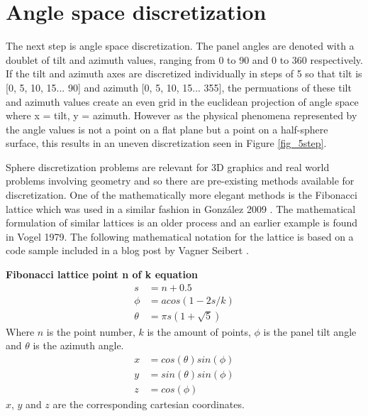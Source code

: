 \section{Angle space discretization}\label{angle_space_discretization}
The next step is angle space discretization. The panel angles are denoted with a doublet of tilt and azimuth values, ranging from 0 to 90 and 0 to 360 respectively. If the tilt and azimuth axes are discretized individually in steps of 5 so that tilt is [0, 5, 10, 15... 90] and azimuth [0, 5, 10, 15... 355], the permuations of these tilt and azimuth values create an even grid in the euclidean projection of angle space where x = tilt, y = azimuth. However as the physical phenomena represented by the angle values is not a point on a flat plane but a point on a half-sphere surface, this results in an uneven discretization seen in Figure \ref{fig_5step}. 

Sphere discretization problems are relevant for 3D graphics and real world problems involving geometry and so there are pre-existing methods available for discretization. One of the mathematically more elegant methods is the Fibonacci lattice which was used in a similar fashion in González 2009 \cite{Gonzlez}. The mathematical formulation of similar lattices is an older process and an earlier example is found in Vogel 1979\cite{fibolat_old}. The following mathematical notation for the lattice is based on a code sample included in a blog post by Vagner Seibert \cite{medium_fibolat_equation}.




\noindent \textbf{Fibonacci lattice point n of k equation}
\begin{align}
	s &= n + 0.5 \\
	\phi &= acos(1 - 2 s / k) \\
	\theta &= \pi s (1 + \sqrt{5})
\end{align}
Where $n$ is the point number, $k$ is the amount of points, $\phi$ is the panel tilt angle and $\theta$ is the azimuth angle.
\begin{align}
	x &= cos(\theta)sin(\phi)\\
	y &= sin(\theta)sin(\phi)\\
	z &= cos(\phi)
\end{align}
$x$, $y$ and $z$ are the corresponding cartesian coordinates.
\vspace{5mm}


